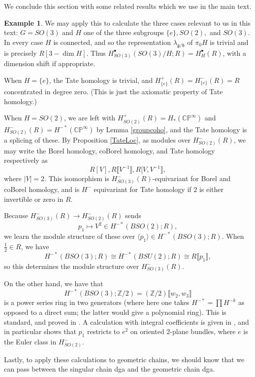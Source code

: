 \documentclass{memo-l}
\theoremstyle{definition}
\newtheorem{example}[theorem]{Example}
\theoremstyle{remark}
\numberwithin{section}{chapter}
\numberwithin{equation}{chapter}
\begin{document}
We conclude this section with some related results which we use in the main text.

\begin{example}\label{SO3calc}We may apply this to calculate the three cases relevant to us in this text: $G = SO(3)$ and $H$ one of the three subgroups $\{e\}, SO(2),$ and $SO(3)$. In every case $H$ is connected, and so the representation $\lambda_{\mathfrak g/\mathfrak h}$ of $\pi_0 H$ is trivial and is precisely $R[3 - \dim H]$. Thus $H^\bullet_{SO(3)}(SO(3)/H; R) = H^\bullet_H(R)$, with a dimension shift if appropriate.

When $H = \{e\}$, the Tate homology is trivial, and $H^+_{\{e\}}(R) = H^-_{\{e\}}(R) = R$ concentrated in degree zero. (This is just the axiomatic property of Tate homology.) 

When $H = SO(2)$, we are left with $H^+_{SO(2)}(R) = H_*(\mathbb{CP}^\infty)$ and $H^-_{SO(2)}(R) = H^{-*}(\mathbb{CP}^\infty)$ by Lemma \ref{groupcoho}, and the Tate homology is a splicing of these. By Proposition \ref{TateLoc}, as modules over $H^-_{SO(2)}(R)$, we may write the Borel homology, coBorel homology, and Tate homology respectively as $$R[V], R\llbracket V^{-1}\rrbracket, R[V, V^{-1}\rrbracket,$$ where $|V| = 2$. This isomorphism is $H^-_{SO(3)}(R)$-equivariant for Borel and coBorel homology, and is $H^-$ equivariant for Tate homology if $2$ is either invertible or zero in $R$. 

Because $H^-_{SO(3)}(R) \to H^-_{SO(2)}(R)$ sends $$p_1 \mapsto V^2 \in H^{-*}(BSO(2);R),$$ we learn the module structure of these over $\langle p_1\rangle \in H^{-*}(BSO(3);R)$. When $\frac 12 \in R$, we have 
$$H^{-*}(BSO(3);R) \cong H^{-*}(BSU(2);R) \cong R\llbracket p_1\rrbracket,$$ 
so this determines the module structure over $H^-_{SO(3)}(R)$. 

On the other hand, we have that $$H^{-*}(BSO(3);\mathbb Z/2) = (\mathbb Z/2)\llbracket w_2, w_3\rrbracket$$ is a power series ring in two generators (where here one takes $H^{-*} = \prod H^{-k}$ as opposed to a direct sum; the latter would give a polynomial ring). This is standard, and proved in \cite[Proposition~3.12]{hatchervector}. A calculation with integral coefficients is given in \cite{brown1982cohomology}, and in particular shows that $p_1$ restricts to $e^2$ on oriented 2-plane bundles, where $e$ is the Euler class in $H^-_{SO(2)}$. 
\end{example}

Lastly, to apply these calculations to geometric chains, we should know that we can pass between the singular chain dga and the geometric chain dga.
\end{document}
